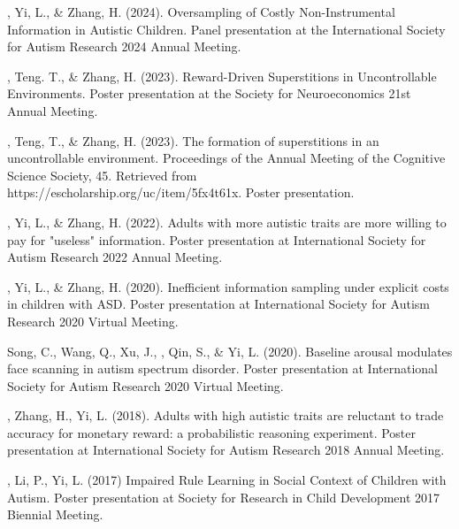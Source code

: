 \begin{etaremune}
  \item \ME, Yi, L., \& Zhang, H. (2024). Oversampling of Costly Non-Instrumental Information in Autistic Children. Panel presentation at the International Society for Autism Research 2024 Annual Meeting.
  \item \ME, Teng. T., \& Zhang, H. (2023). Reward-Driven Superstitions in Uncontrollable Environments. Poster presentation at the Society for Neuroeconomics 21st Annual Meeting.
  \item \ME, Teng, T., \& Zhang, H. (2023). The formation of superstitions in an uncontrollable environment. Proceedings of the Annual Meeting of the Cognitive Science Society, 45. Retrieved from \\https://escholarship.org/uc/item/5fx4t61x. Poster presentation.
  \item \ME, Yi, L., \& Zhang, H. (2022). Adults with more autistic traits are more willing to pay for "useless" information. Poster presentation at International Society for Autism Research 2022 Annual Meeting.
  \item \ME, Yi, L., \& Zhang, H. (2020). Inefficient information sampling under explicit costs in children with ASD. Poster presentation at International Society for Autism Research 2020 Virtual Meeting.
  \item Song, C., Wang, Q., Xu, J., \ME, Qin, S., \& Yi, L. (2020). Baseline arousal modulates face scanning in autism spectrum disorder. Poster presentation at International Society for Autism Research 2020 Virtual Meeting.
  \item \ME, Zhang, H., Yi, L. (2018). Adults with high autistic traits are reluctant to trade accuracy for monetary reward: a probabilistic reasoning experiment. Poster presentation at International Society for Autism Research 2018 Annual Meeting.
  \item \ME, Li, P., Yi, L. (2017) Impaired Rule Learning in Social Context of Children with Autism. Poster presentation at Society for Research in Child Development 2017 Biennial Meeting.
\end{etaremune}

